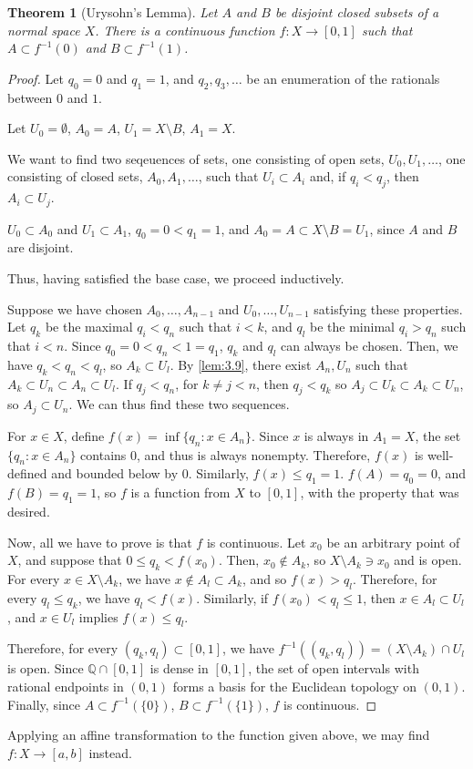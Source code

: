 \documentclass[openany, amssymb, psamsfonts]{amsart}
\let\fullref\autoref
\newtheorem{thm}{Theorem}[section]
\theoremstyle{definition}
\numberwithin{equation}{section}
\begin{document}
\begin{thm}[Urysohn's Lemma] \label{thm:3.8}
  Let $A$ and $B$ be disjoint closed subsets of a normal space $X$. There is a continuous function $f: X\to [0,1]$ such that $A \subset f^{-1}(0)$ and $B\subset f^{-1}(1)$. 
\end{thm}
\begin{proof}
  Let $q_0 = 0$ and $q_1 = 1$, and $q_2, q_3, \ldots$ be an enumeration of the rationals between $0$ and $1$. 

  Let $U_0 = \emptyset$, $A_0 = A$, $U_1 = X \setminus B$, $A_1 = X$. 

  We want to find two seqeuences of sets, one consisting of open sets, $U_0, U_1, \ldots$, one consisting of closed sets, $A_0, A_1, \ldots$, such that $U_i \subset A_i$ and, if $q_i < q_j$, then $A_i \subset U_j$. 

  $U_0 \subset A_0$ and $U_1 \subset A_1$, $q_0 = 0 < q_1 = 1$, and $A_0 = A \subset X\setminus B = U_1$, since $A$ and $B$ are disjoint. 

  Thus, having satisfied the base case, we proceed inductively. 

  Suppose we have chosen $A_0, \ldots, A_{n-1}$ and $U_0, \ldots, U_{n-1}$ satisfying these properties. Let $q_k$ be the maximal $q_i< q_n$ such that $i < k$, and $q_l$ be the minimal $q_i > q_n$ such that $i < n$. Since $q_0 = 0 < q_n < 1 = q_1$, $q_k$ and $q_l$ can always be chosen. Then, we have $q_k < q_n < q_l$, so $A_k \subset U_l$. By \fullref{lem:3.9}, there exist $A_n, U_n$ such that $A_k \subset U_n \subset A_n \subset U_l$. If $q_j < q_n$, for $k \neq j < n$, then $q_j < q_k$ so $A_j \subset U_k \subset A_k \subset U_n$, so $A_j \subset U_n$. We can thus find these two sequences. 

  For $x \in X$, define $f(x) = \inf\{q_n : x \in A_n\}$. Since $x$ is always in $A_1 = X$, the set $\{q_n : x \in A_n\}$ contains $0$, and thus is always nonempty. Therefore, $f(x)$ is well-defined and bounded below by $0$. Similarly, $f(x) \le q_1 = 1$. $f(A) = q_0 = 0$, and $f(B) = q_1 = 1$, so $f$ is a function from $X$ to $[0,1]$, with the property that was desired. 

  Now, all we have to prove is that $f$ is continuous. Let $x_0$ be an arbitrary point of $X$, and suppose that $0 \le q_k < f(x_0)$. Then, $x_0 \not\in A_k$, so $X \setminus A_k \ni x_0$ and is open. For every $x \in X \setminus A_k$, we have $x \not \in A_l \subset A_k$, and so $f(x) > q_l$. Therefore, for every $q_l \le q_k$, we have $q_l < f(x)$. Similarly, if $f(x_0) < q_l \le 1$, then $x \in A_l \subset U_l$, and $x \in U_l$ implies $f(x) \le q_l$. 

  Therefore, for every $(q_k, q_l) \subset [0,1]$, we have $f^{-1}((q_k, q_l)) = (X \setminus A_k) \cap U_l$ is open. Since $\mathbb Q \cap [0,1]$ is dense in $[0,1]$, the set of open intervals with rational endpoints in $(0,1)$ forms a basis for the Euclidean topology on $(0,1)$. Finally, since $A \subset f^{-1}(\{0\})$, $B \subset f^{-1}(\{1\})$, $f$ is continuous. 
\end{proof}
Applying an affine transformation to the function given above, we may find $f: X \to [a,b]$ instead. 
\end{document}
